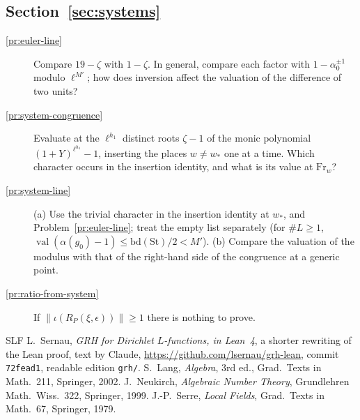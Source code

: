 \documentclass[reqno]{amsart}
\theoremstyle{definition}
\theoremstyle{plain}
\newcommand{\val}{\operatorname{val}}
\newcommand{\St}{\mathrm{St}}
\newcommand{\bd}{\mathrm{bd}}
\newcommand{\Fr}{\mathrm{Fr}}
\begin{document}
\subsection*{Section~\ref{sec:systems}}
\begin{description}
\item[\ref{pr:euler-line}] Compare \(19 - \zeta\) with \(1 - \zeta\).  In general, compare each factor with \(1 - \alpha_0^{\pm 1}\) modulo \(\ell^{M'}\); how does inversion affect the valuation of the difference of two units?
\item[\ref{pr:system-congruence}] Evaluate at the \(\ell^{h_1}\) distinct roots \(\zeta - 1\) of the monic polynomial \((1 + Y)^{\ell^{h_1}} - 1\), inserting the places \(w \ne w_*\) one at a time.  Which character occurs in the insertion identity, and what is its value at \(\Fr_w\)?
\item[\ref{pr:system-line}] (a) Use the trivial character in the insertion identity at \(w_*\), and Problem~\ref{pr:euler-line}; treat the empty list separately (for \(\#L \ge 1\), \(\val(\alpha(g_0) - 1) \le \bd(\St)/2 < M'\)).  (b) Compare the valuation of the modulus with that of the right-hand side of the congruence at a generic point.
\item[\ref{pr:ratio-from-system}] If \(\lVert\iota(R_P(\xi, \epsilon))\rVert \ge 1\) there is nothing to prove.
\end{description}

{\small
\begin{thebibliography}{SLF}
 L.~Sernau, \emph{GRH for Dirichlet \(L\)-functions, in Lean~4}, a shorter rewriting of the Lean proof, text by Claude, \url{https://github.com/lsernau/grh-lean}, commit \texttt{72fead1}, readable edition \texttt{grh/}.
 S.~Lang, \emph{Algebra}, 3rd ed., Grad.\ Texts in Math.\ 211, Springer, 2002.
 J.~Neukirch, \emph{Algebraic Number Theory}, Grundlehren Math.\ Wiss.\ 322, Springer, 1999.
 J.-P.~Serre, \emph{Local Fields}, Grad.\ Texts in Math.\ 67, Springer, 1979.
\end{thebibliography}
}
\end{document}
